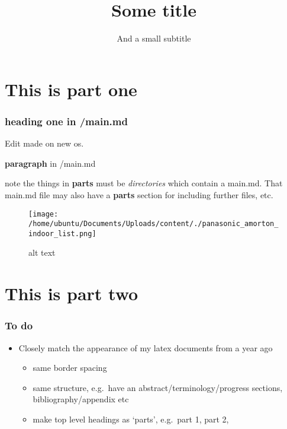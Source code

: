 \documentclass{paper}
\title{Some title}
\subtitle{And a small subtitle}
\def\tightlist{} %
\begin{document}
\begin{multicols*}{2}

\maketitle
% 
% 
% 
\vfill\null
\columnbreak

\setcounter{tocdepth}{2}
\tableofcontents

\end{multicols*}

% 

% 



\part{This is part one}

\hypertarget{heading-one-in-main.md}{%
\section{heading one in /main.md}\label{heading-one-in-main.md}}

Edit made on new os.

\textbf{paragraph} in /main.md

note the things in \textbf{parts} must be \emph{directories} which
contain a main.md. That main.md file may also have a \textbf{parts}
section for including further files, etc.

\begin{figure}
\centering
\texttt{[image: /home/ubuntu/Documents/Uploads/content/./panasonic\_amorton\_indoor\_list.png]}
\caption{alt text}
\end{figure}

\part{This is part two}

\hypertarget{to-do}{%
\section{To do}\label{to-do}}

\begin{itemize}
\tightlist
\item
  Closely match the appearance of my latex documents from a year ago

  \begin{itemize}
  \tightlist
  \item
    same border spacing
  \item
    same structure, e.g.~have an abstract/terminology/progress sections,
    bibliography/appendix etc
  \item
    make top level headings as `parts', e.g.~part 1, part 2,
  \end{itemize}
\end{itemize}
\end{document}
